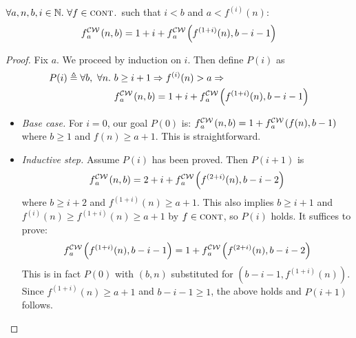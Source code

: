 \begin{lem} \label{lem: cdt-intermediate}
	$\forall a, n, b, i \in \mathbb{N}.~\forall f \in \text{\scshape{cont}}$.~such that $i < b$ and $a < f^{(i)}(n)$:~
	\begin{equation}  \label{eq: cdt-intermediate}
	\cdw{f}{a}(n, b) = 1 + i + \cdw{f}{a}\left(f^{(1+i)}(n), b - i - 1\right)
	\end{equation}
\end{lem}
\begin{proof}
	Fix $a$. We proceed by induction on $i$. Then define $P(i)$ as
	\begin{equation*}
	\begin{aligned}
	P(i) \triangleq \forall b,~\forall n.~& b\ge i+1 \Rightarrow f^{(i)}(n) > a \Rightarrow \\
	 & \cdw{f}{a}(n, b) = 1 + i + \cdw{f}{a}\left(f^{(1+i)}(n), b - i - 1\right)
	\end{aligned}
	\end{equation*}
	\begin{itemize}[leftmargin=*]
		\item \textit{Base case.} For $i = 0$, our goal $P(0)$ is:
		$\cdw{f}{a}(n, b) = 1 + \cdw{f}{a}\left(f(n), b - 1\right)$
		where $b \ge 1$ and $f(n)\ge a+1$. This is straightforward.
		\item \textit{Inductive step.} Assume $P(i)$ has been proved. Then $P(i+1)$ is
		\begin{equation*}
		\cdw{f}{a}(n, b) = 2 + i + \cdw{f}{a}\left( f^{(2+i)}(n), b - i - 2 \right)
		\end{equation*}
		where $b \ge i+2$ and $f^{(1+i)}(n) \ge a+1$. This also implies $b\ge i+1$ and $\displaystyle f^{(i)}(n) \ge f^{(1+i)}(n)\ge a+1$ by $f\in \text{\scshape{cont}}$, so $P(i)$ holds. It suffices to prove:
		\begin{equation*}
		\cdw{f}{a}\left(f^{(1+i)}(n), b-i-1\right) = 1 + \cdw{f}{a}\left( f^{(2+i)}(n), b-i-2 \right)
		\end{equation*}
		This is in fact $P(0)$ with $(b, n)$ substituted for $\left(b-i-1, f^{(1+i)}(n)\right)$. Since $f^{(1+i)}(n) \ge a+1$ and $b-i-1\ge 1$, the above holds and $P(i+1)$ follows.
	\end{itemize}
\end{proof}
